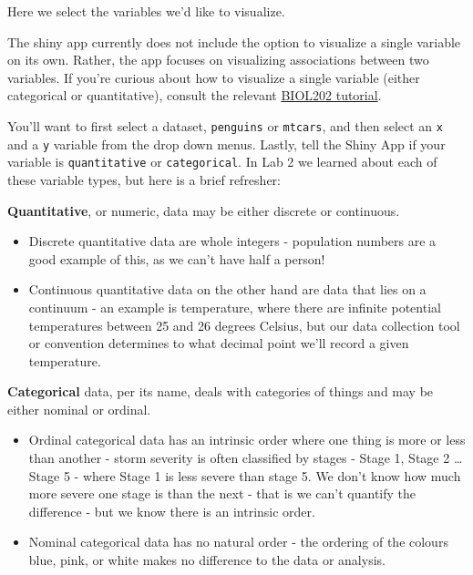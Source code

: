 \documentclass[
]{book}
\providecommand{\tightlist}{%
  \setlength{\itemsep}{0pt}\setlength{\parskip}{0pt}}
\begin{document}
Here we select the variables we'd like to visualize.

The shiny app currently does not include the option to visualize a single variable on its own. Rather, the app focuses on visualizing associations between two variables. If you're curious about how to visualize a single variable (either categorical or quantitative), consult the relevant \href{https://ubco-biology.github.io/BIOL202/vis-variable.html}{BIOL202 tutorial}.

You'll want to first select a dataset, \texttt{penguins} or \texttt{mtcars}, and then select an \texttt{x} and a \texttt{y} variable from the drop down menus. Lastly, tell the Shiny App if your variable is \texttt{quantitative} or \texttt{categorical}. In Lab 2 we learned about each of these variable types, but here is a brief refresher:

\textbf{Quantitative}, or numeric, data may be either discrete or continuous.

\begin{itemize}
\tightlist
\item
  Discrete quantitative data are whole integers - population numbers are a good example of this, as we can't have half a person!
\item
  Continuous quantitative data on the other hand are data that lies on a continuum - an example is temperature, where there are infinite potential temperatures between 25 and 26 degrees Celsius, but our data collection tool or convention determines to what decimal point we'll record a given temperature.
\end{itemize}

\textbf{Categorical} data, per its name, deals with categories of things and may be either nominal or ordinal.

\begin{itemize}
\tightlist
\item
  Ordinal categorical data has an intrinsic order where one thing is more or less than another - storm severity is often classified by stages - Stage 1, Stage 2 \ldots{} Stage 5 - where Stage 1 is less severe than stage 5. We don't know how much more severe one stage is than the next - that is we can't quantify the difference - but we know there is an intrinsic order.
\item
  Nominal categorical data has no natural order - the ordering of the colours blue, pink, or white makes no difference to the data or analysis.
\end{itemize}
\end{document}

